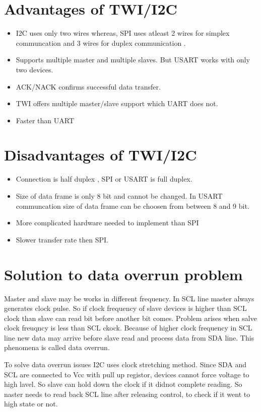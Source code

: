 \documentclass{article}
\begin{document}
\section{Advantages of TWI/I2C}

\begin{itemize}
	\item I2C uses only two wires whereas,
	 SPI uses atleast 2 wires for simplex communcation and 3 wires for duplex communication . 
	 \item Supports multiple master and multiple slaves. But USART works with only two devices.
	 \item ACK/NACK confirms successful data transfer.
	 \item TWI offers multiple master/slave support which UART does not.
	 \item Faster than UART
\end{itemize}

\pagebreak
\section{Disadvantages of TWI/I2C}

\begin{itemize}
	\item Connection is half duplex , SPI or USART is full duplex.
	\item Size of data frame is only 8 bit and cannot be changed.
	 In USART communcation size of data frame can be choosen from between 8 and 9 bit.
	\item More complicated hardware needed to implement than SPI
	\item Slower transfer rate then SPI.
\end{itemize}

\section{Solution to data overrun problem}
Master and slave may be works in different frequency.
In SCL line master always generates clock pulse.
So if clock frequency of slave devices is higher than SCL clock than slave can read bit before another bit comes.
Problem arises when salve clock freuqncy is less than SCL ckock.
Because of higher clock frequency in SCL line new data may arrive before slave read and process data from SDA line.
This phenomena is called data overrun.


To solve data overrun issues I2C uses clock stretching method. 
Since SDA and SCL are connected to Vcc with pull up registor, devices cannot force voltage to high lavel. 
So slave can hold down the clock if it didnot complete reading.
So naster needs to read back SCL line  after releasing control, to check if it went to high state or not. 
\end{document}
